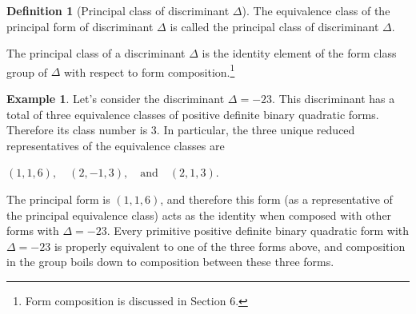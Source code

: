 \documentclass{article}
\theoremstyle{definition}
\newtheorem{definition}{Definition}[section]
\theoremstyle{theorem}
\theoremstyle{example}
\newtheorem{example}{Example}[section]
\theoremstyle{corollary}
\begin{document}
\bigskip

\theoremstyle{definition}
\begin{definition}[Principal class of discriminant \(\Delta\)]
The equivalence class of the principal form of discriminant \(\Delta\) is called the principal class of discriminant \(\Delta\).
\end{definition}

\bigskip

The principal class of a discriminant \(\Delta\) is the identity element of the form class group of \(\Delta\) with respect to form composition.\footnote{Form composition is discussed in Section 6.}

\bigskip

\theoremstyle{example}
\begin{example}
Let's consider the discriminant \(\Delta = -23\). This discriminant has a total of three equivalence classes of positive definite binary quadratic forms. Therefore its class number is 3. In particular, the three unique reduced representatives of the equivalence classes are
\begin{center}
\((1, 1, 6), \quad (2, -1, 3), \quad \textrm{and} \quad (2, 1, 3)\).
\end{center}
The principal form is \((1, 1, 6)\), and therefore this form (as a representative of the principal equivalence class) acts as the identity when composed with other forms with \(\Delta = -23\). Every primitive positive definite binary quadratic form with \(\Delta = -23\) is properly equivalent to one of the three forms above, and composition in the group boils down to composition between these three forms. \square
\end{example}

\bigskip
\end{document}
